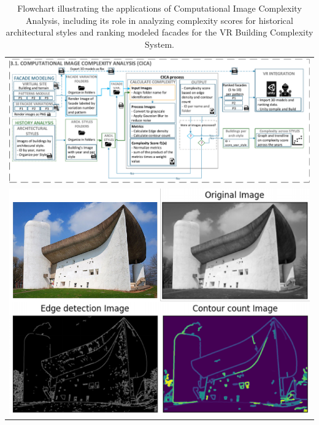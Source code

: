 \documentclass[final,5p,times]{elsarticle}%
\begin{document}
\begin{linenumbers}
            \begin{table}[h!tb]
                \centering
                \small
                \begin{tabular}{c}
                    \begin{minipage}{\textwidth}
                        \centering
                        \includegraphics[width= \linewidth]{Images/ImageComplexityAnalysisFlowchart}
                        \caption{Flowchart illustrating the applications of Computational Image Complexity Analysis, including its role in analyzing complexity scores for historical architectural styles and ranking modeled facades for the VR Building Complexity System.}
                      \label{fig:ImageComplexityAnalysisFlowchart}
                    \end{minipage}
                    \\
                    \begin{minipage}{\textwidth}
                        \centering
                        \begin{minipage}{0.49\textwidth}
                            \includegraphics[width= \linewidth]{Images/ComplexityPlotHistoryCICA}

\end{minipage}
\end{minipage}
\end{tabular}
\end{table}
\end{linenumbers}
\end{document}
